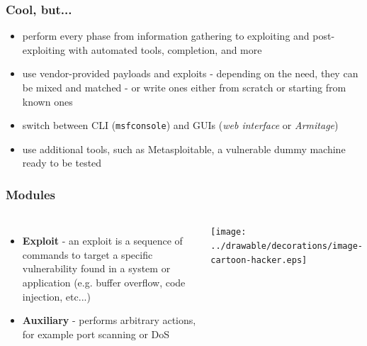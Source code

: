\documentclass[handout]{beamer}
\begin{document}
\begin{frame}
	\frametitle{Cool, but...}


	\begin{itemize}
		\item<2-> perform every phase from information gathering to exploiting and post-exploiting with automated tools, completion, and more
		\item<3-> use vendor-provided payloads and exploits - depending on the need, they can be mixed and matched - or write ones either from scratch or starting from known ones
		\item<4-> switch between CLI (\texttt{msfconsole}) and GUIs (\textit{web interface} or \textit{Armitage})
		\item<5-> use additional tools, such as Metasploitable, a vulnerable dummy machine ready to be tested
	\end{itemize}
\end{frame}

\begin{frame}
	\frametitle{Modules}

	\begin{columns}



		\begin{itemize}
			\item<3-> \textbf{Exploit} - an exploit is a sequence of commands to target a specific vulnerability found in a system or application (e.g. buffer overflow, code injection, etc...)
			\item<4-> \textbf{Auxiliary} - performs arbitrary actions, for example port scanning or DoS
		\end{itemize}

		\centering
		\texttt{[image: ../drawable/decorations/image-cartoon-hacker.eps]}
	\end{columns}

\end{frame}
\end{document}
